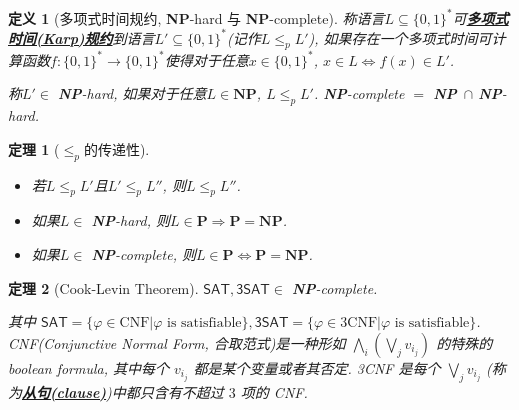 \documentclass[8pt]{article}
\theoremstyle{compact}
\newtheorem{theorem}{定理}[section]
\newtheorem{definition}{定义}[section]
\def\obj#1{\textbf{\uline{#1}}}
\def\le{\leqslant}
\def\P{\textbf{P}}
\def\NP{\textbf{NP}}
\begin{document}
\begin{definition}[多项式时间规约, \NP-hard 与 \NP-complete]
	称语言$L \subseteq \{0, 1\}^*$可\obj{多项式时间(Karp)规约}到语言$L' \subseteq \{0, 1\}^*$(记作$L \le_p L'$), 如果存在一个多项式时间可计算函数$f: \{0, 1\}^* \to \{0, 1\}^*$使得对于任意$x \in \{0, 1\}^*$, $x \in L \Leftrightarrow f(x) \in L'$. 

	称$L' \in $ \NP-hard, 如果对于任意$L \in \NP$, $L \le_p L'$. \NP-complete $=$ \NP\ $\cap$ \NP-hard.  
\end{definition}
\begin{theorem}[$\le_p$的传递性]
	\begin{itemize}
		\item 若$L \le_p L'$且$L' \le_p L''$, 则$L \le_p L''$. 
		\item 如果$L \in $ \NP-hard, 则$L \in \P \Rightarrow \P = \NP$. 
		\item 如果$L \in $ \NP-complete, 则$L \in \P \Leftrightarrow \P = \NP$. 
	\end{itemize}
\end{theorem}
\begin{theorem}[Cook-Levin Theorem]
	$\textsf{SAT}, \textsf{3SAT} \in $ \NP-complete. 

	其中 $\textsf{SAT} = \{\varphi \in \text{CNF} | \varphi \text{ is satisfiable}\}, \textsf{3SAT} = \{\varphi \in 3\text{CNF} | \varphi \text{ is satisfiable}\}$. CNF(Conjunctive Normal Form, 合取范式)是一种形如 $\bigwedge_i\left(\bigvee_j v_{i_j}\right)$ 的特殊的 boolean formula, 其中每个 $v_{i_j}$ 都是某个变量或者其否定. 3CNF 是每个 $\bigvee_j v_{i_j}$ (称为\obj{从句(clause)})中都只含有不超过 $3$ 项的 CNF.
\end{theorem}
\end{document}
